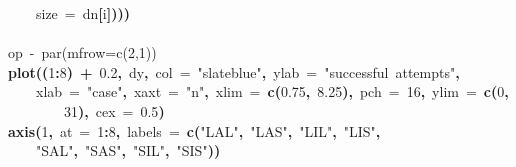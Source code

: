 \documentclass{article}
\makeatletter
\newcommand{\hlnumber}[1]{\textcolor[rgb]{0,0,0}{#1}}%
\newcommand{\hlfunctioncall}[1]{\textcolor[rgb]{.5,0,.33}{\textbf{#1}}}%
\newcommand{\hlstring}[1]{\textcolor[rgb]{.6,.6,1}{#1}}%
\newcommand{\hlkeyword}[1]{\textbf{#1}}%
\newcommand{\hlargument}[1]{\textcolor[rgb]{.69,.25,.02}{#1}}%
\newcommand{\hlcomment}[1]{\textcolor[rgb]{.18,.6,.34}{#1}}%
\newcommand{\hlsymbol}[1]{#1}%
\newcommand{\hlstd}[1]{\textcolor[rgb]{0,0,0}{#1}}%
\newenvironment{kframe}{%
 \def\FrameCommand##1{\hskip\@totalleftmargin \hskip-\fboxsep
 \colorbox{shadecolor}{##1}\hskip-\fboxsep
     \hskip-\linewidth \hskip-\@totalleftmargin \hskip\columnwidth}%
 \MakeFramed {\advance\hsize-\width
   \@totalleftmargin\z@ \linewidth\hsize
   \@setminipage}}%
 {\par\unskip\endMakeFramed}
\newenvironment{knitrout}{}{} %
\makeatother
\begin{document}
\begin{knitrout}
{\begin{kframe}
\begin{flushleft}
\hlstd{}{\ }{\ }{\ }{\ }\hlargument{size}{\ }\hlargument{=}{\ }\hlsymbol{d}\hlkeyword{\usebox{\hlnormalsizeboxdollar}}\hlsymbol{n}\hlkeyword{[}\hlsymbol{i}\hlkeyword{]}\hlkeyword{)}\hlkeyword{)}\hlkeyword{)}\hspace*{\fill}\\
\hlstd{}\hspace*{\fill}\\
\hlstd{}\hlcomment{\usebox{\hlnormalsizeboxhash}op{\ }\usebox{\hlnormalsizeboxlessthan}-{\ }par(mfrow=c(2,1))}\hspace*{\fill}\\
\hlstd{}\hlfunctioncall{plot}\hlkeyword{(}\hlkeyword{(}\hlnumber{1}\hlkeyword{:}\hlnumber{8}\hlkeyword{)}{\ }\hlkeyword{+}{\ }\hlnumber{0.2}\hlkeyword{,}{\ }\hlsymbol{d}\hlkeyword{\usebox{\hlnormalsizeboxdollar}}\hlsymbol{y}\hlkeyword{,}{\ }\hlargument{col}{\ }\hlargument{=}{\ }\hlstring{"slateblue"}\hlkeyword{,}{\ }\hlargument{ylab}{\ }\hlargument{=}{\ }\hlstring{"successful{\ }attempts"}\hlkeyword{,}\hspace*{\fill}\\
\hlstd{}{\ }{\ }{\ }{\ }\hlargument{xlab}{\ }\hlargument{=}{\ }\hlstring{"case"}\hlkeyword{,}{\ }\hlargument{xaxt}{\ }\hlargument{=}{\ }\hlstring{"n"}\hlkeyword{,}{\ }\hlargument{xlim}{\ }\hlargument{=}{\ }\hlfunctioncall{c}\hlkeyword{(}\hlnumber{0.75}\hlkeyword{,}{\ }\hlnumber{8.25}\hlkeyword{)}\hlkeyword{,}{\ }\hlargument{pch}{\ }\hlargument{=}{\ }\hlnumber{16}\hlkeyword{,}{\ }\hlargument{ylim}{\ }\hlargument{=}{\ }\hlfunctioncall{c}\hlkeyword{(}\hlnumber{0}\hlkeyword{,}\hspace*{\fill}\\
\hlstd{}{\ }{\ }{\ }{\ }{\ }{\ }{\ }{\ }\hlnumber{31}\hlkeyword{)}\hlkeyword{,}{\ }\hlargument{cex}{\ }\hlargument{=}{\ }\hlnumber{0.5}\hlkeyword{)}\hspace*{\fill}\\
\hlstd{}\hlfunctioncall{axis}\hlkeyword{(}\hlnumber{1}\hlkeyword{,}{\ }\hlargument{at}{\ }\hlargument{=}{\ }\hlnumber{1}\hlkeyword{:}\hlnumber{8}\hlkeyword{,}{\ }\hlargument{labels}{\ }\hlargument{=}{\ }\hlfunctioncall{c}\hlkeyword{(}\hlstring{"LAL"}\hlkeyword{,}{\ }\hlstring{"LAS"}\hlkeyword{,}{\ }\hlstring{"LIL"}\hlkeyword{,}{\ }\hlstring{"LIS"}\hlkeyword{,}\hspace*{\fill}\\
\hlstd{}{\ }{\ }{\ }{\ }\hlstring{"SAL"}\hlkeyword{,}{\ }\hlstring{"SAS"}\hlkeyword{,}{\ }\hlstring{"SIL"}\hlkeyword{,}{\ }\hlstring{"SIS"}\hlkeyword{)}\hlkeyword{)}\hspace*{\fill}\\

\end{flushleft}
\end{kframe}}
\end{knitrout}
\end{document}
